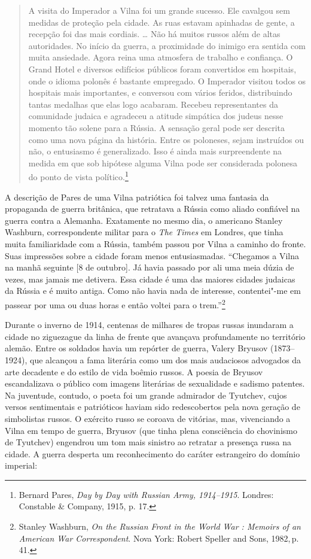 \begin{quote}
A visita do Imperador a Vilna foi um grande sucesso. Ele cavalgou sem
medidas de proteção pela cidade. As ruas estavam apinhadas de gente, a
recepção foi das mais cordiais. \ldots{} Não há muitos russos além de
altas autoridades. No início da guerra, a proximidade do inimigo era
sentida com muita ansiedade. Agora reina uma atmosfera de trabalho e
confiança. O Grand Hotel e diversos edifícios públicos foram convertidos
em hospitais, onde o idioma polonês é bastante empregado. O Imperador
visitou todos os hospitais mais importantes, e conversou com vários
feridos, distribuindo tantas medalhas que elas logo acabaram. Recebeu
representantes da comunidade judaica e agradeceu a atitude simpática dos
judeus nesse momento tão solene para a Rússia. A sensação geral pode ser
descrita como uma nova página da história. Entre os poloneses, sejam
instruídos ou não, o entusiasmo é generalizado. Isso é ainda mais
surpreendente na medida em que sob hipótese alguma Vilna pode ser
considerada polonesa do ponto de vista político.\footnote{Bernard Pares, \textit{Day by Day with Russian Army, 1914--1915}. Londres: Constable \& Company, 1915, p. 17.} 
\end{quote}

A descrição de Pares de uma Vilna patriótica foi talvez uma fantasia da
propaganda de guerra britânica, que retratava a Rússia como aliado
confiável na guerra contra a Alemanha. Exatamente no mesmo dia, o
americano Stanley Washburn, correspondente militar para o \textit{The
Times} em Londres, que tinha muita familiaridade com a Rússia, também
passou por Vilna a caminho do fronte. Suas impressões sobre a cidade
foram menos entusiasmadas. ``Chegamos a Vilna na manhã seguinte {[}8 de
outubro{]}. Já havia passado por ali uma meia dúzia de vezes, mas jamais
me detivera. Essa cidade é uma das maiores cidades judaicas da Rússia e
é muito antiga. Como não havia nada de interesse, contentei"-me em
passear por uma ou duas horas e então voltei para o trem.''\footnote{Stanley Washburn, \textit{On the Russian Front in the World War : Memoirs of an American War Correspondent}. Nova York: Robert Speller and Sons, 1982,\,p.\,41.} %

Durante o inverno de 1914, centenas de milhares de tropas russas
inundaram a cidade no ziguezague da linha de frente que avançava
profundamente no território alemão. Entre os soldados havia um repórter
de guerra, Valery Bryusov (1873--1924), que alcançou a fama literária
como um dos mais audaciosos advogados da arte decadente e do estilo de
vida boêmio russos. A poesia de Bryusov escandalizava o público com
imagens literárias de sexualidade e sadismo patentes. Na juventude,
contudo, o poeta foi um grande admirador de Tyutchev, cujos versos
sentimentais e patrióticos haviam sido redescobertos pela nova geração
de simbolistas russos. O exército russo se coroava de vitórias, mas,
vivenciando a Vilna em tempo de guerra, Bryusov (que tinha plena
consciência do chovinismo de Tyutchev) engendrou um tom mais sinistro ao
retratar a presença russa na cidade. A guerra desperta um reconhecimento
do caráter estrangeiro do domínio imperial:

